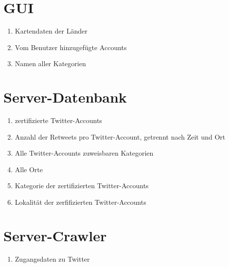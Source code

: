 \section{GUI}
\begin{enumerate}[align=left, label={\textbf{\textbackslash PD00\arabic*0\textbackslash}}]
	\item Kartendaten der Länder
	\item Vom Benutzer hinzugefügte Accounts
	\item Namen aller Kategorien
\end{enumerate}
	
\section{Server-Datenbank}
\begin{enumerate}[align=left, label={\textbf{\textbackslash PD10\arabic*0\textbackslash}}]
	\item zertifizierte Twitter-Accounts	
	\item Anzahl der Retweets pro Twitter-Account, getrennt nach Zeit und Ort
	\item Alle Twitter-Accounts zuweisbaren Kategorien
	\item Alle Orte
	\item Kategorie der zertifizierten Twitter-Accounts
	\item Lokalität der zerfifizierten Twitter-Accounts
\end{enumerate}

\section{Server-Crawler}
\begin{enumerate}[align=left, label={\textbf{\textbackslash PD20\arabic*0\textbackslash}}]
	\item Zugangsdaten zu Twitter
\end{enumerate}

